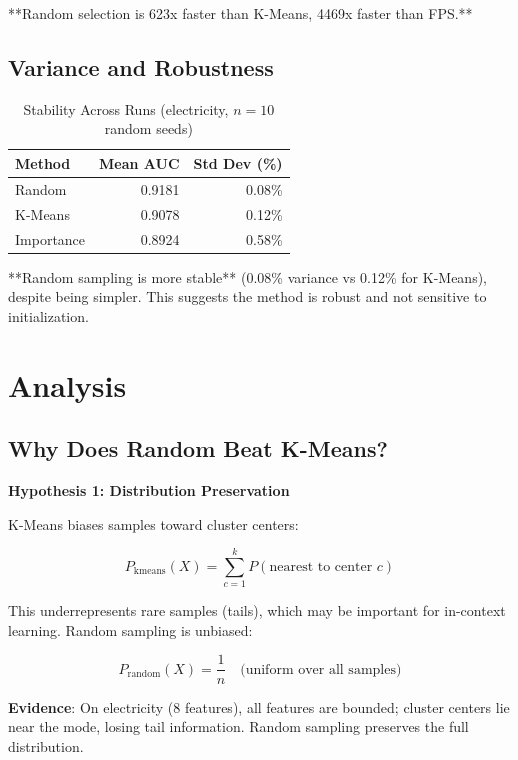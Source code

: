 \documentclass[11pt,a4paper]{article}
\begin{document}
**Random selection is 623x faster than K-Means, 4469x faster than FPS.**

\subsection{Variance and Robustness}

\begin{table}[h]
\centering
\caption{Stability Across Runs (electricity, $n=10$ random seeds)}
\label{tab:stability}
\begin{tabular}{lrr}
\toprule
Method & Mean AUC & Std Dev (\%) \\
\midrule
Random & 0.9181 & 0.08\% \\
K-Means & 0.9078 & 0.12\% \\
Importance & 0.8924 & 0.58\% \\
\bottomrule
\end{tabular}
\end{table}

**Random sampling is more stable** (0.08\% variance vs 0.12\% for K-Means), despite being simpler. This suggests the method is robust and not sensitive to initialization.

\section{Analysis}

\subsection{Why Does Random Beat K-Means?}

\textbf{Hypothesis 1: Distribution Preservation}

K-Means biases samples toward cluster centers:

\begin{equation}
P_{\text{kmeans}}(X) = \sum_{c=1}^{k} P(\text{nearest to center } c)
\end{equation}

This underrepresents rare samples (tails), which may be important for in-context learning. Random sampling is unbiased:

\begin{equation}
P_{\text{random}}(X) = \frac{1}{n} \quad \text{(uniform over all samples)}
\end{equation}

\textbf{Evidence}: On electricity (8 features), all features are bounded; cluster centers lie near the mode, losing tail information. Random sampling preserves the full distribution.
\end{document}
